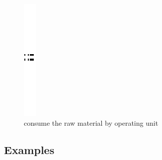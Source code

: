 \begin{figure}[th]
\centering
		\quad{}\quad{}
			\includegraphics{ch3/img/sep}
	\quad{}\quad{}
\caption{\label{fig:consume the raw material by operating unit} consume the raw material by operating unit}
\end{figure}




\subsection{Examples }

